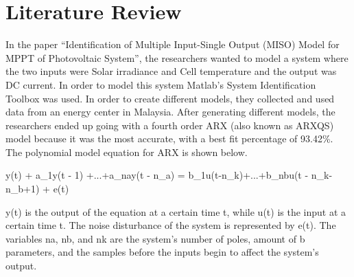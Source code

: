 \documentclass[letterpaper,12pt]{article}   %
\begin{document}
 \section{Literature Review}
In the paper “Identification of Multiple Input-Single Output (MISO) Model for MPPT of Photovoltaic System”, the researchers wanted to model a system where the two inputs were Solar irradiance and Cell temperature and the output was DC current. In order to model this system Matlab’s System Identification Toolbox was used. In order to create different models, they collected and used data from an energy center in Malaysia. After generating different models, the researchers ended up going with a fourth order ARX (also known as ARXQS) model because it was the most accurate, with a best fit percentage of 93.42\%. The polynomial model equation for ARX is shown below. 

y(t) + a_1y(t - 1) +...+a_{na}y(t - n_{a}) = b_{1}u(t-n_{k})+...+b_{nb}u(t - n_{k}-n_{b}+1) + e(t)

y(t) is the output of the equation at a certain time t, while u(t) is the input at a certain time t. The noise disturbance of the system is represented by e(t). The variables na, nb, and nk are the system’s number of poles, amount of b parameters, and the samples before the inputs begin to affect the system’s output.


\end{document}

